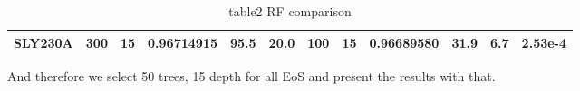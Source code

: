 \begin{table}[]
\begin{tabular}{@{}|c|ccccc|ccccc|c|@{}}
SLY230A                & \multicolumn{1}{c|}{300}            & \multicolumn{1}{c|}{15}             & \multicolumn{1}{c|}{0.96714915}     & \multicolumn{1}{c|}{95.5}        & 20.0            & \multicolumn{1}{c|}{100}            & \multicolumn{1}{c|}{15}             & \multicolumn{1}{c|}{0.96689580}     & \multicolumn{1}{c|}{31.9}        & 6.7             & 2.53e-4         \\ \bottomrule
\end{tabular}
\caption{table2 RF comparison}
\label{tab:RF2}
\end{table}



And therefore we select 50 trees, 15 depth for all EoS and present the results with that.


